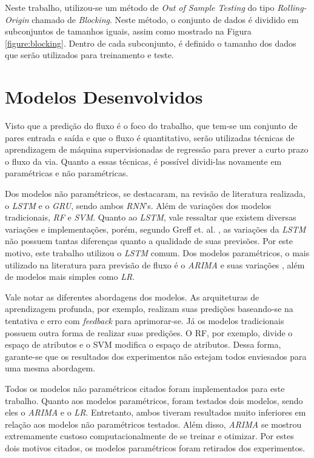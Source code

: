 Neste trabalho, utilizou-se um método de \textit{Out of Sample Testing} do tipo \textit{Rolling-Origin} chamado de \textit{Blocking}. Neste método, o conjunto de dados é dividido em subconjuntos de tamanhos iguais, assim como mostrado na Figura \ref{figure:blocking}. Dentro de cada subconjunto, é definido o tamanho dos dados que serão utilizados para treinamento e teste.

\section{Modelos Desenvolvidos}

Visto que a predição do fluxo é o foco do trabalho, que tem-se um conjunto de pares entrada e saída e que o fluxo é quantitativo, serão utilizadas técnicas de aprendizagem de máquina supervisionadas de regressão para prever a curto prazo o fluxo da via. Quanto a essas técnicas, é possível dividi-las novamente em paramétricas e não paramétricas.

Dos modelos não paramétricos, se destacaram, na revisão de literatura realizada, o \textit{\acrshort{LSTM}} e o \textit{\acrshort{GRU}}, sendo ambos \textit{\acrshort{RNN}}'s. Além de variações dos modelos tradicionais, \textit{\acrshort{RF}} e \textit{\acrshort{SVM}}. Quanto ao \textit{\acrshort{LSTM}}, vale ressaltar que existem diversas variações e implementações, porém, segundo Greff et. al. \cite{Greff_2015}, as variações da \textit{\acrshort{LSTM}} não possuem tantas diferenças quanto a qualidade de suas previsões. Por este motivo, este trabalho utilizou o \textit{\acrshort{LSTM}} comum. Dos modelos paramétricos, o mais utilizado na literatura para previsão de fluxo é o \textit{\acrshort{ARIMA}} e suas variações \cite{doi:10.1080/01441647.2014.992496}, além de modelos mais simples como \textit{\acrfull{LR}}.

Vale notar as diferentes abordagens dos modelos. As arquiteturas de aprendizagem profunda, por exemplo, realizam suas predições baseando-se na tentativa e erro com \textit{feedback} para aprimorar-se. Já os modelos tradicionais possuem outra forma de realizar suas predições. O \acrshort{RF}, por exemplo, divide o espaço de atributos e o \acrshort{SVM} modifica o espaço de atributos. Dessa forma, garante-se que os resultados dos experimentos não estejam todos enviesados para uma mesma abordagem.

Todos os modelos não paramétricos citados foram implementados para este trabalho. Quanto aos modelos paramétricos, foram testados dois modelos, sendo eles o \textit{\acrshort{ARIMA}} e o \textit{\acrshort{LR}}. Entretanto, ambos tiveram resultados muito inferiores em relação aos modelos não paramétricos testados. Além disso, \textit{\acrshort{ARIMA}} se mostrou extremamente custoso computacionalmente de se treinar e otimizar. Por estes dois motivos citados, os modelos paramétricos foram retirados dos experimentos.



